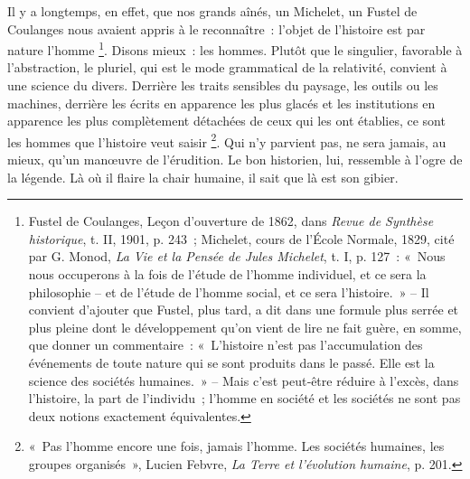 \documentclass[french,twoside]{book} %
\newcommand{\astermono}{\medskip\centerline{\color{rubric}\large\selectfont{\syms ✻}}\medskip\par}%
\begin{document}
\label{p4} Il y a longtemps, en effet, que nos grands aînés, un Michelet, un Fustel de Coulanges nous avaient appris à le reconnaître : l’objet de l’histoire est par nature l’homme \footnote{Fustel de Coulanges, Leçon d’ouverture de 1862, dans \emph{Revue de Synthèse historique}, t. II, 1901, p. 243 ; Michelet, cours de l’École Normale, 1829, cité par G. Monod, \emph{La Vie et la Pensée de Jules Michelet}, t. I, p. 127 : « Nous nous occuperons à la fois de l’étude de l’homme individuel, et ce sera la philosophie – et de l’étude de l’homme social, et ce sera l’histoire. » – Il convient d’ajouter que Fustel, plus tard, a dit dans une formule plus serrée et plus pleine dont le développement qu’on vient de lire ne fait guère, en somme, que donner un com­mentaire : « L’histoire n’est pas l’accumulation des événements de toute nature qui se sont produits dans le passé. Elle est la science des sociétés humaines. » – Mais c’est peut‑être réduire à l’excès, dans l’histoire, la part de l’individu ; l’homme en société et les sociétés ne sont pas deux notions exactement équivalentes.}. Disons mieux : les hommes. Plutôt que le singu­lier, favorable à l’abstraction, le pluriel, qui est le mode grammatical de la relativité, convient à une science du divers. Derrière les traits sensibles du paysage, les outils ou les machines, derrière les écrits en apparence les plus glacés et les institutions en apparence les plus complètement détachées de ceux qui les ont établies, ce sont les hommes que l’histoire veut saisir \footnote{« Pas l’homme encore une fois, jamais l’homme. Les sociétés humaines, les groupes organisés », Lucien Febvre, \emph{La Terre et l’évolution humaine}, p. 201.}. Qui n’y parvient pas, ne sera jamais, au mieux, qu’un manœuvre de l’érudition. Le bon historien, lui, ressemble à l’ogre de la légende. Là où il flaire la chair humaine, il sait que là est son gibier.\par

\astermono
\end{document}
